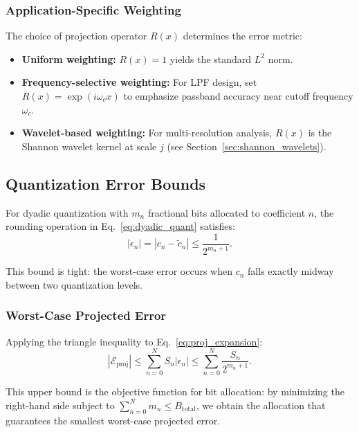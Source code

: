 \subsubsection{Application-Specific Weighting}

The choice of projection operator $R(x)$ determines the error metric:
\begin{itemize}
\item \textbf{Uniform weighting:} $R(x) = 1$ yields the standard $L^2$ norm.
\item \textbf{Frequency-selective weighting:} For LPF design, set $R(x) = \exp(i \omega_c x)$ to emphasize passband accuracy near cutoff frequency $\omega_c$.
\item \textbf{Wavelet-based weighting:} For multi-resolution analysis, $R(x)$ is the Shannon wavelet kernel at scale $j$ (see Section~\ref{sec:shannon_wavelets}).
\end{itemize}

\subsection{Quantization Error Bounds}
\label{sec:quant_error_bounds}

For dyadic quantization with $m_n$ fractional bits allocated to coefficient $n$, the rounding operation in Eq.~\eqref{eq:dyadic_quant} satisfies:
\begin{equation}
|\epsilon_n| = |c_n - \tilde{c}_n| \leq \frac{1}{2^{m_n+1}}.
\label{eq:quant_bound}
\end{equation}

This bound is tight: the worst-case error occurs when $c_n$ falls exactly midway between two quantization levels.

\subsubsection{Worst-Case Projected Error}

Applying the triangle inequality to Eq.~\eqref{eq:proj_expansion}:
\begin{equation}
|\mathcal{E}_{\text{proj}}| \leq \sum_{n=0}^{N} S_n |\epsilon_n| \leq \sum_{n=0}^{N} \frac{S_n}{2^{m_n+1}}.
\label{eq:error_bound}
\end{equation}

This upper bound is the objective function for bit allocation: by minimizing the right-hand side subject to $\sum_{n=0}^{N} m_n \leq B_{\text{total}}$, we obtain the allocation that guarantees the smallest worst-case projected error.

